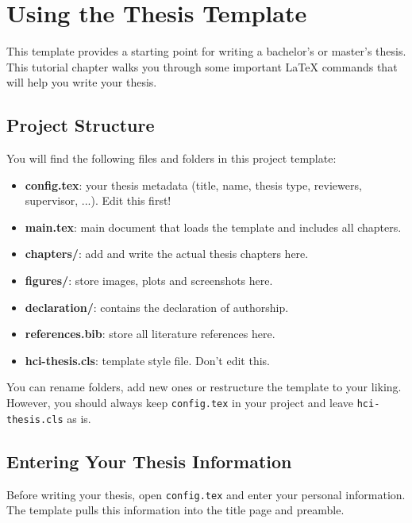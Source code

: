 \chapter{Using the Thesis Template}

This template provides a starting point for writing a bachelor's or master's thesis. This tutorial chapter walks you through some important \LaTeX{} commands that will help you write your thesis.

\section{Project Structure}

You will find the following files and folders in this project template:

\begin{itemize}
    \item \textbf{config.tex}: your thesis metadata (title, name, thesis type, reviewers, supervisor, ...). Edit this first!
    \item \textbf{main.tex}: main document that loads the template and includes all chapters.
    \item \textbf{chapters/}: add and write the actual thesis chapters here.
    \item \textbf{figures/}: store images, plots and screenshots here.
    \item \textbf{declaration/}:  contains the declaration of authorship.
    \item \textbf{references.bib}: store all literature references here.
    \item \textbf{hci-thesis.cls}: template style file. Don't edit this.
\end{itemize}

You can rename folders, add new ones or restructure the template to your liking. However, you should always keep \texttt{config.tex} in your project and leave \texttt{hci-thesis.cls} as is.

\section{Entering Your Thesis Information}

Before writing your thesis, open \texttt{config.tex} and enter your personal information. The template pulls this information into the title page and preamble.

